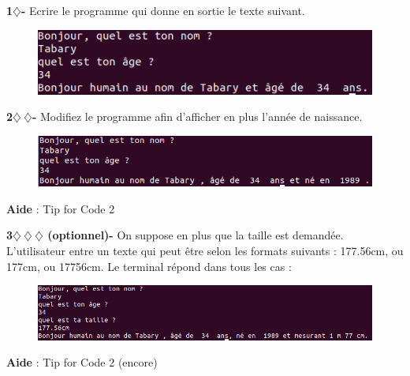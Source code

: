 \begin{tcolorbox}[lefttitle=2cm, colframe=gray!75!black, title= \textbf{Exercices}]
\textbf{1$\diamondsuit$-}
Ecrire le programme qui donne en sortie le texte suivant.
\begin{figure}[H]
    \centering
    \includegraphics[scale=0.6]{chapitre1/figures/entree2.png}
\end{figure}
\textbf{2$\diamondsuit~\diamondsuit$-}
Modifiez le programme afin d'afficher en plus l'année de naissance.
\begin{figure}[H]
    \centering
    \includegraphics[scale=0.6]{chapitre1/figures/entree3.png}
\end{figure}


\textbf{Aide} : Tip for Code 2 

\textbf{3$\diamondsuit~\diamondsuit~\diamondsuit$ (optionnel)-}
On suppose en plus que la taille est demandée.
L'utilisateur entre un texte qui peut être selon les formats suivants : 177.56cm, ou 177cm, ou 17756cm.
Le terminal répond dans tous les cas :
\begin{figure}[H]
    \centering
    \includegraphics[scale=0.6]{chapitre1/figures/entree4.png}
\end{figure}
\textbf{Aide} : Tip for Code 2 (encore)

\end{tcolorbox}

